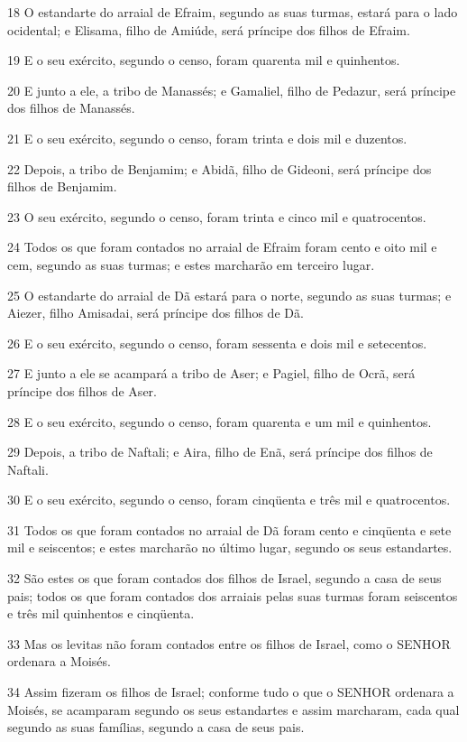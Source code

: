 \par 18 O estandarte do arraial de Efraim, segundo as suas turmas, estará para o lado ocidental; e Elisama, filho de Amiúde, será príncipe dos filhos de Efraim.
\par 19 E o seu exército, segundo o censo, foram quarenta mil e quinhentos.
\par 20 E junto a ele, a tribo de Manassés; e Gamaliel, filho de Pedazur, será príncipe dos filhos de Manassés.
\par 21 E o seu exército, segundo o censo, foram trinta e dois mil e duzentos.
\par 22 Depois, a tribo de Benjamim; e Abidã, filho de Gideoni, será príncipe dos filhos de Benjamim.
\par 23 O seu exército, segundo o censo, foram trinta e cinco mil e quatrocentos.
\par 24 Todos os que foram contados no arraial de Efraim foram cento e oito mil e cem, segundo as suas turmas; e estes marcharão em terceiro lugar.
\par 25 O estandarte do arraial de Dã estará para o norte, segundo as suas turmas; e Aiezer, filho Amisadai, será príncipe dos filhos de Dã.
\par 26 E o seu exército, segundo o censo, foram sessenta e dois mil e setecentos.
\par 27 E junto a ele se acampará a tribo de Aser; e Pagiel, filho de Ocrã, será príncipe dos filhos de Aser.
\par 28 E o seu exército, segundo o censo, foram quarenta e um mil e quinhentos.
\par 29 Depois, a tribo de Naftali; e Aira, filho de Enã, será príncipe dos filhos de Naftali.
\par 30 E o seu exército, segundo o censo, foram cinqüenta e três mil e quatrocentos.
\par 31 Todos os que foram contados no arraial de Dã foram cento e cinqüenta e sete mil e seiscentos; e estes marcharão no último lugar, segundo os seus estandartes.
\par 32 São estes os que foram contados dos filhos de Israel, segundo a casa de seus pais; todos os que foram contados dos arraiais pelas suas turmas foram seiscentos e três mil quinhentos e cinqüenta.
\par 33 Mas os levitas não foram contados entre os filhos de Israel, como o SENHOR ordenara a Moisés.
\par 34 Assim fizeram os filhos de Israel; conforme tudo o que o SENHOR ordenara a Moisés, se acamparam segundo os seus estandartes e assim marcharam, cada qual segundo as suas famílias, segundo a casa de seus pais.

